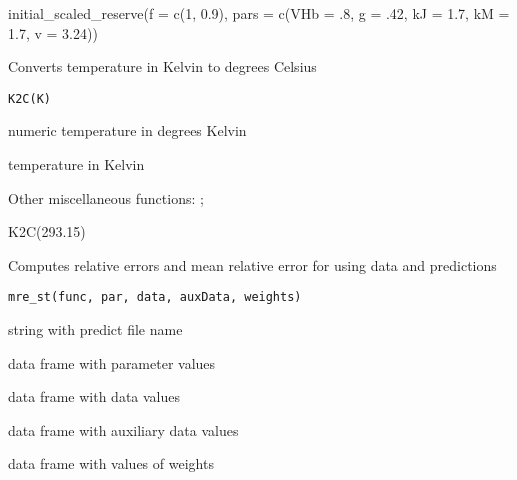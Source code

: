 \documentclass[a4paper]{book}
\begin{document}
%
\begin{Examples}
\begin{ExampleCode}
initial_scaled_reserve(f = c(1, 0.9), pars = c(VHb = .8, g = .42, kJ = 1.7, kM = 1.7, v = 3.24))
\end{ExampleCode}
\end{Examples}
%
\begin{Description}\relax
Converts temperature in Kelvin to degrees Celsius
\end{Description}
%
\begin{Usage}
\begin{verbatim}
K2C(K)
\end{verbatim}
\end{Usage}
%
\begin{Arguments}
\begin{ldescription}
\item[\code{K}] numeric temperature in degrees Kelvin
\end{ldescription}
\end{Arguments}
%
\begin{Value}
temperature in Kelvin
\end{Value}
%
\begin{SeeAlso}\relax
Other miscellaneous functions: ;
\end{SeeAlso}
%
\begin{Examples}
\begin{ExampleCode}
K2C(293.15)
\end{ExampleCode}
\end{Examples}
%
\begin{Description}\relax
Computes relative errors and mean relative error for using data and predictions
\end{Description}
%
\begin{Usage}
\begin{verbatim}
mre_st(func, par, data, auxData, weights)
\end{verbatim}
\end{Usage}
%
\begin{Arguments}
\begin{ldescription}
\item[\code{func}] string with predict file name

\item[\code{par}] data frame with parameter values

\item[\code{data}] data frame with data values

\item[\code{auxData}] data frame with auxiliary data values

\item[\code{weights}] data frame with values of weights
\end{ldescription}
\end{Arguments}
\end{document}
